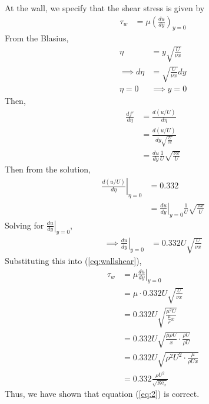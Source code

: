 At the wall, we specify that the shear stress is given by
\begin{align}
    \tau_w &= \mu \left( \frac{du}{dy} \right)_{y=0}  \label{eq:wallshear}
\end{align}
From the Blasius, 
\begin{align*}
    \eta &= y \sqrt{\frac{U}{\nu x}} \\
    \implies d \eta &= \sqrt{\frac{U}{\nu x}} dy \\
    \eta = 0 &\implies y = 0
\end{align*}
Then,
\begin{align*}
    \frac{d f'}{d\eta} &= \frac{d (u/U)}{d\eta} \\
    &= \frac{d (u/U)}{dy \sqrt{\frac{U}{\nu x}}} \\
    &= \frac{du}{dy} \frac{1}{U} \sqrt{\frac{\nu x}{U}} 
\end{align*}
Then from the solution,
\begin{align*}
    \left. \frac{d(u/U)}{d\eta} \right|_{\eta=0} &= 0.332 \\
    &= \left. \frac{du}{dy} \right|_{y=0} \frac{1}{U} \sqrt{\frac{\nu x}{U}}
\end{align*}
Solving for $\left. \frac{du}{dy} \right|_{y=0}$,
\begin{align*}
    \implies \left. \frac{du}{dy} \right|_{y=0} &= 0.332 U \sqrt{\frac{U}{\nu x}} 
\end{align*}
Substituting this into (\ref{eq:wallshear}),
\begin{align*}
    \tau_w &= \mu \left. \frac{du}{dy} \right|_{y=0} \\
    &= \mu \cdot 0.332 U \sqrt{\frac{U}{\nu x}} \\
    &= 0.332 U \sqrt{\frac{\mu^2 U}{\frac{\mu}{\rho}x}} \\
    &= 0.332 U \sqrt{\frac{\mu \rho U}{x} \cdot \frac{\rho U}{\rho U}} \\
    &= 0.332 U \sqrt{\rho^2 U^2 \cdot \frac{\mu}{\rho U x}} \\
    &= \boxed{0.332 \frac{\rho U^2}{\sqrt{\text{Re}_x}}}
\end{align*}
Thus, we have shown that equation (\ref{eq:2}) is correct.